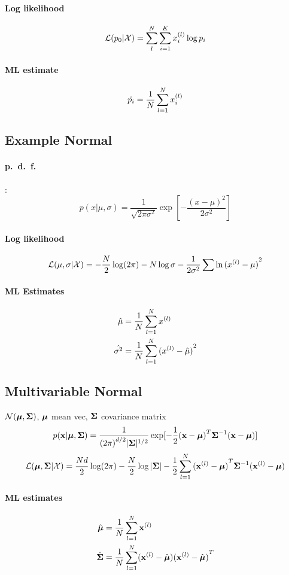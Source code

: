 \paragraph{Log likelihood} \[\mathcal{L} (p_0|\mathcal{X}) = \sum_l^N\sum_{i=1}^K x_i^{(l)}
    \log p_i\]

\paragraph{ML estimate} \[\hat{p_i} = \frac{1}{N}\sum_{l=1}^N x^{(l)}_i\]

\subsection{Example Normal} \paragraph{p.\ d.\ f.}: \[p(x|\mu, \sigma ) =
    \frac{1}{\sqrt{2\pi\sigma^2}}\exp[-\frac{{(x-\mu)}^2}{2\sigma^2}]\]
    \paragraph{Log likelihood} \[\mathcal{L}(\mu, \sigma|\mathcal{X}) = -\frac{N}{2}\log(2\pi) - N\log\sigma -
    \frac{1}{2\sigma^2}\sum\ln{(x^{(l)}- \mu)}^2\]
    \paragraph{ML Estimates} \begin{align*}
        \hat{\mu} &= \frac{1}{N}\sum_{l=1}^N x^{(l)}\\
        \hat{\sigma^2} &= \frac{1}{N}\sum_{l=1}^N {(x^{(l)} - \hat{\mu})}^2 \end{align*}
\subsection{Multivariable Normal} $\mathcal{N}(\boldsymbol\mu,\boldsymbol\Sigma)$, $\boldsymbol\mu$ mean vec, $\boldsymbol\Sigma$
    covariance matrix
    \[p(\mathbf{x}|\boldsymbol\mu, \boldsymbol\Sigma) = \frac{1}{{(2\pi)}^{d/2}|\boldsymbol\Sigma|^{1/2}}
        \exp[-\frac{1}{2}{(\mathbf{x} -\boldsymbol\mu)}^T\boldsymbol\Sigma^{-1}(\mathbf{x} - \boldsymbol\mu)]\]
\[\mathcal{L} (\boldsymbol\mu,\boldsymbol\Sigma|\mathcal{X}) = \frac{Nd}{2}\log(2\pi) - \frac{N}{2}\log|\boldsymbol\Sigma|
-\frac{1}{2}\sum_{l=1}^N{(\mathbf{x}^{(l)} - \boldsymbol\mu)}^T\boldsymbol\Sigma^{-1}(\mathbf{x}^{(l)} - \boldsymbol\mu)\]
\paragraph{ML estimates} \begin{align*}\hat{\boldsymbol\mu} &= \frac{1}{N}\sum_{l=1}^N
    \mathbf{x}^{(l)} \\
    \hat{\boldsymbol\Sigma} &= \frac{1}{N}\sum_{l=1}^N(\mathbf{x}^{(l)} - \hat{\boldsymbol\mu}){(\mathbf{x}^{(l)} -
    \hat{\boldsymbol\mu})}^T\end{align*}
